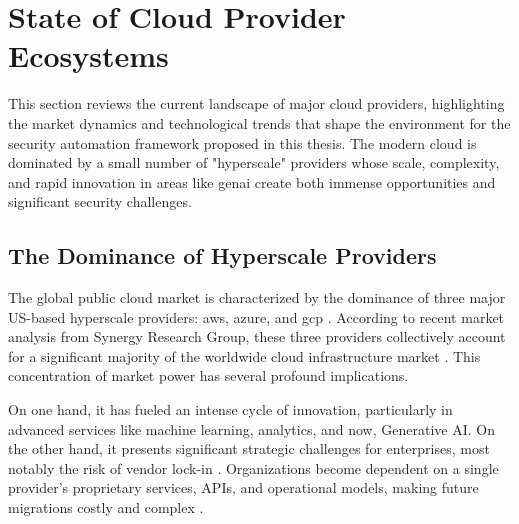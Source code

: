 \section{State of Cloud Provider Ecosystems}
\label{sec:cloud_ecosystems}

This section reviews the current landscape of major cloud providers, highlighting the market dynamics and technological trends that shape the environment for the security automation framework proposed in this thesis. The modern cloud is dominated by a small number of "hyperscale" providers whose scale, complexity, and rapid innovation in areas like \gls{genai} create both immense opportunities and significant security challenges.

\subsection{The Dominance of Hyperscale Providers}
The global public cloud market is characterized by the dominance of three major US-based hyperscale providers: \gls{aws}, \gls{azure}, and \gls{gcp} \cite{n_koritala_cloud-first_2025}. According to recent market analysis from Synergy Research Group, these three providers collectively account for a significant majority of the worldwide cloud infrastructure market \cite{noauthor_european_nodate}. This concentration of market power has several profound implications.

On one hand, it has fueled an intense cycle of innovation, particularly in advanced services like machine learning, analytics, and now, Generative AI. On the other hand, it presents significant strategic challenges for enterprises, most notably the risk of vendor lock-in \cite{patel_comparative_nodate}. Organizations become dependent on a single provider’s proprietary services, APIs, and operational models, making future migrations costly and complex \cite{n_koritala_cloud-first_2025}.

